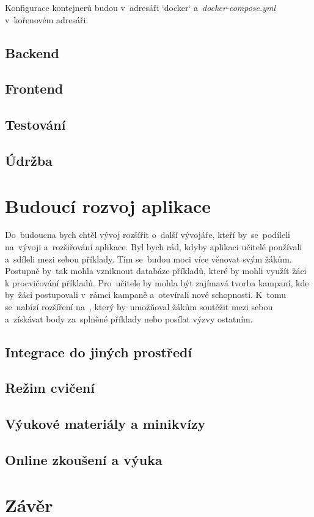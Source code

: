 \documentclass[14pt]{article}
\begin{document}
        Konfigurace kontejnerů budou v~adresáři `docker` a~\emph{docker-compose.yml} v~kořenovém adresáři.
        \subsection{Backend}
        \subsection{Frontend}
        \subsection{Testování}
        \subsection{Údržba}
        
	\section{Budoucí rozvoj aplikace}
        Do~budoucna bych chtěl vývoj rozšířit o~další vývojáře, kteří by~se~podíleli na~vývoji a~rozšiřování aplikace.
        Byl bych rád, kdyby aplikaci učitelé používali a~sdíleli mezi sebou příklady. Tím se~budou moci více věnovat svým žákům.
        Postupně by~tak mohla vzniknout databáze příkladů, které by mohli využít žáci k procvičování příkladů. Pro~učitele by mohla být zajímavá tvorba kampaní, kde by~žáci postupovali v~rámci kampaně a~otevírali nové schopnosti.
        K~tomu se~nabízí rozšíření na~, který by~umožňoval žákům soutěžit mezi sebou a~získávat body za~splněné příklady nebo posílat výzvy ostatním.

        \subsection{Integrace do jiných prostředí}
        \subsection{Režim cvičení}
        \subsection{Výukové materiály a minikvízy}
        \subsection{Online zkoušení a výuka}
	
	\section{Závěr}

\newpage
\printbibliography
\end{document}
